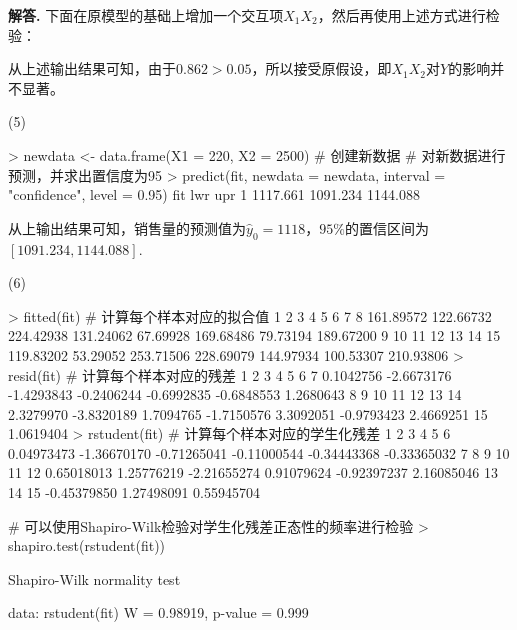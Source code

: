 \documentclass[12pt, a4paper, oneside]{ctexart}
\newenvironment{solution}[1][]{\par\noindent\textbf{#1解答. }}{\smallskip\par}  %
\begin{document}
\begin{solution}
下面在原模型的基础上增加一个交互项$X_1X_2$，然后再使用上述方式进行检验：
从上述输出结果可知，由于$0.862 > 0.05$，所以接受原假设，即$X_1X_2$对$Y$的影响并不显著。

(5)
\begin{rcode}
> newdata <- data.frame(X1 = 220, X2 = 2500)  # 创建新数据
# 对新数据进行预测，并求出置信度为95%
> predict(fit, newdata = newdata, interval = "confidence", level = 0.95)
       fit      lwr      upr
1 1117.661 1091.234 1144.088
\end{rcode}
从上输出结果可知，销售量的预测值为$_0 = 1118$，$95\%$的置信区间为$[1091.234,1144.088]$.

(6) 
\begin{rcode}
> fitted(fit)  # 计算每个样本对应的拟合值
    1         2         3         4         5         6         7         8 
161.89572 122.66732 224.42938 131.24062  67.69928 169.68486  79.73194 189.67200 
    9        10        11        12        13        14        15 
119.83202  53.29052 253.71506 228.69079 144.97934 100.53307 210.93806
> resid(fit)  # 计算每个样本对应的残差
         1          2          3          4          5          6          7 
 0.1042756 -2.6673176 -1.4293843 -0.2406244 -0.6992835 -0.6848553  1.2680643 
         8          9         10         11         12         13         14 
 2.3279970 -3.8320189  1.7094765 -1.7150576  3.3092051 -0.9793423  2.4669251 
        15 
 1.0619404 
> rstudent(fit)  # 计算每个样本对应的学生化残差
 1           2           3           4           5           6 
0.04973473 -1.36670170 -0.71265041 -0.11000544 -0.34443368 -0.33365032 
 7           8           9          10          11          12 
0.65018013  1.25776219 -2.21655274  0.91079624 -0.92397237  2.16085046 
13          14          15 
-0.45379850  1.27498091  0.55945704 

# 可以使用Shapiro-Wilk检验对学生化残差正态性的频率进行检验
> shapiro.test(rstudent(fit))

    Shapiro-Wilk normality test

data:  rstudent(fit)
W = 0.98919, p-value = 0.999


\end{rcode}
\end{solution}
\end{document}
